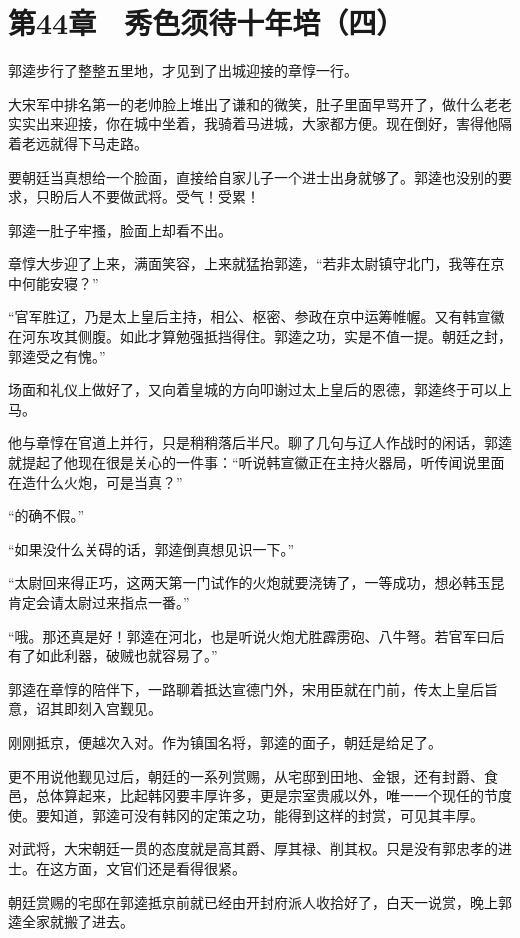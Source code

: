 \section{第44章　秀色须待十年培（四）}

郭逵步行了整整五里地，才见到了出城迎接的章惇一行。

大宋军中排名第一的老帅脸上堆出了谦和的微笑，肚子里面早骂开了，做什么老老实实出来迎接，你在城中坐着，我骑着马进城，大家都方便。现在倒好，害得他隔着老远就得下马走路。

要朝廷当真想给一个脸面，直接给自家儿子一个进士出身就够了。郭逵也没别的要求，只盼后人不要做武将。受气！受累！

郭逵一肚子牢搔，脸面上却看不出。

章惇大步迎了上来，满面笑容，上来就猛抬郭逵，“若非太尉镇守北门，我等在京中何能安寝？”

“官军胜辽，乃是太上皇后主持，相公、枢密、参政在京中运筹帷幄。又有韩宣徽在河东攻其侧腹。如此才算勉强抵挡得住。郭逵之功，实是不值一提。朝廷之封，郭逵受之有愧。”

场面和礼仪上做好了，又向着皇城的方向叩谢过太上皇后的恩德，郭逵终于可以上马。

他与章惇在官道上并行，只是稍稍落后半尺。聊了几句与辽人作战时的闲话，郭逵就提起了他现在很是关心的一件事：“听说韩宣徽正在主持火器局，听传闻说里面在造什么火炮，可是当真？”

“的确不假。”

“如果没什么关碍的话，郭逵倒真想见识一下。”

“太尉回来得正巧，这两天第一门试作的火炮就要浇铸了，一等成功，想必韩玉昆肯定会请太尉过来指点一番。”

“哦。那还真是好！郭逵在河北，也是听说火炮尤胜霹雳砲、八牛弩。若官军曰后有了如此利器，破贼也就容易了。”

郭逵在章惇的陪伴下，一路聊着抵达宣德门外，宋用臣就在门前，传太上皇后旨意，诏其即刻入宫觐见。

刚刚抵京，便越次入对。作为镇国名将，郭逵的面子，朝廷是给足了。

更不用说他觐见过后，朝廷的一系列赏赐，从宅邸到田地、金银，还有封爵、食邑，总体算起来，比起韩冈要丰厚许多，更是宗室贵戚以外，唯一一个现任的节度使。要知道，郭逵可没有韩冈的定策之功，能得到这样的封赏，可见其丰厚。

对武将，大宋朝廷一贯的态度就是高其爵、厚其禄、削其权。只是没有郭忠孝的进士。在这方面，文官们还是看得很紧。

朝廷赏赐的宅邸在郭逵抵京前就已经由开封府派人收拾好了，白天一说赏，晚上郭逵全家就搬了进去。

